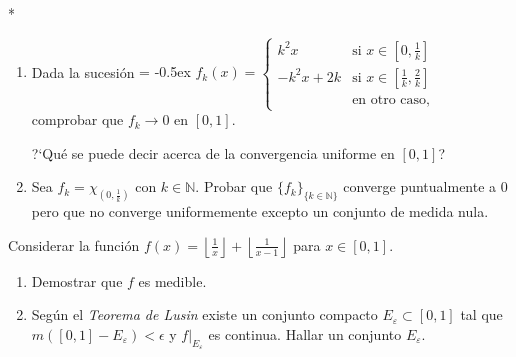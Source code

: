 \documentclass{book}
\newcommand{\nn}{\mathbb{N}}
\begin{document}
\begin{ejer} {}*
\begin{enumerate} 
\item Dada la sucesión
{
\extrarowheight = -0.5ex
\renewcommand{\arraystretch}{2.0}
$f_k(x)=\left\{
\begin{array}{cl}
k^2x &\mbox{si }x\in[0,\frac{1}{k}]
\\
-k^2x+2k &\mbox{si } x\in \left[\frac{1}{k},\frac{2}{k}\right] 
\\
&\mbox{en otro caso,}
\end{array}
\right.
$}\\
comprobar que $f_k \to 0$ en $[0,1]$. 

?`Qué se puede decir acerca de la convergencia uniforme en $[0,1]$?
\item Sea $f_k=\chi_{(0,\frac{1}{k})}$ con $k\in\nn$. 
Probar que $\{f_k\}_{\{k\in\nn\}}$ converge puntualmente a $0$ pero que no converge uniformemente
excepto un conjunto de medida nula.
\end{enumerate}
\end{ejer}

\begin{ejer}{}  
Considerar la funci\'on 
$f(x)=\left\lfloor \frac{1}{x}\right\rfloor+\left\lfloor \frac{1}{x-1}\right\rfloor$
para $x \in [0,1]$.
\begin{enumerate}
\item Demostrar que $f$ es medible.
\item Seg\'un el \textit{Teorema de Lusin} existe  un conjunto compacto $E_{\varepsilon}\subset [0,1]$
tal que $m\left([0,1]-E_{\varepsilon}\right)<\epsilon$ y $f\left.\right|_{E_{\varepsilon}}$ es continua.
Hallar un conjunto $E_{\varepsilon}$.
\end{enumerate}
\end{ejer}


\end{document}
